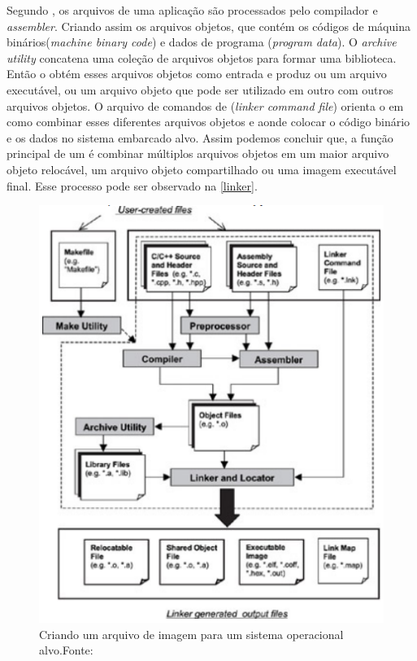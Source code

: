 Segundo , os arquivos de uma aplicação são processados pelo compilador e \textit{assembler}. Criando assim os arquivos objetos, que contém os códigos de máquina binários(\textit{machine binary code}) e dados de programa (\textit{program data}). O \textit{archive utility} concatena uma coleção de arquivos objetos para formar uma biblioteca. Então o \linker obtém esses arquivos objetos como entrada e produz ou um arquivo executável, ou um arquivo objeto que pode ser utilizado em outro \linker com outros arquivos objetos. O arquivo de comandos de \linker (\textit{linker command file}) orienta o \linker em como combinar esses diferentes arquivos objetos e aonde colocar o código binário e os dados no sistema embarcado alvo. Assim podemos concluir que, a função principal de um \linker é combinar múltiplos arquivos objetos em um maior arquivo objeto relocável, um arquivo objeto compartilhado ou uma imagem executável final. Esse processo pode ser observado na \autoref{linker}.

\begin{figure}[H]
    \scriptsize
     \centering
     \includegraphics[scale=1]{dados/figuras/Linker.png}
     \caption{Criando um arquivo de imagem para um sistema operacional alvo.\newline Fonte:\cite{Qing2003}}
     \label{linker}
\end{figure}

